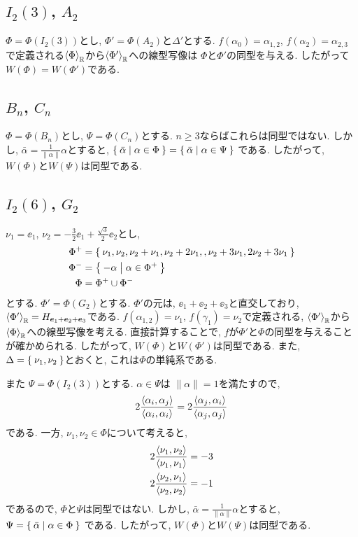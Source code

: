 \subsection{$I_2(3)$, $A_2$}
$\Phi=\Phi(I_2(3))$とし,
$\Phi'=\Phi(A_2)$と$\Delta'$とする.
$f(\alpha_0)=\alpha_{1,2}$,
$f(\alpha_2)=\alpha_{2,3}$
で定義される$\Braket{\Phi}_{\mathbb{R}}$から$\Braket{\Phi'}_{\mathbb{R}}$への線型写像は
$\Phi$と$\Phi'$の同型を与える.
したがって
$W(\Phi)=W(\Phi')$である.


\subsection{$B_n$, $C_n$}
$\Phi=\Phi(B_n)$とし,
$\Psi=\Phi(C_n)$とする.
$n\geq 3$ならばこれらは同型ではない.
しかし,
$\bar\alpha=\frac{1}{\|\alpha\|}\alpha$とすると,
$\Set{\bar\alpha| \alpha\in \Phi}=\Set{\bar\alpha| \alpha\in \Psi}$
である.
したがって, $W(\Phi)$と$W(\Psi)$は同型である.


\subsection{$I_2(6)$, $G_2$}
$\nu_1=\ee_1$, $\nu_2=-\frac{3}{2}\ee_1+\frac{\sqrt{3}}{2}\ee_2$とし,
\begin{align*}
  \Phi^+
  &=
  \Set{\nu_1,\nu_2,\nu_2+\nu_1,\nu_2+2\nu_1,,\nu_2+3\nu_1,2\nu_2+3\nu_1}\\
  \Phi^-&=\Set{-\alpha|\alpha\in\Phi^+}\\
  \Phi&=\Phi^+\cup\Phi^-
\end{align*}
とする.
$\Phi'=\Phi(G_2)$とする.
$\Phi'$の元は, $\ee_1+\ee_2+\ee_3$と直交しており,
$\Braket{\Phi'}_{\mathbb{R}}=H_{\boldsymbol{e}_1+\boldsymbol{e}_2+\boldsymbol{e}_3}$である.
$f(\alpha_{1,2})=\nu_1$,
$f(\gamma_{1})=\nu_2$で定義される,
$\Braket{\Phi'}_{\mathbb{R}}$から
$\Braket{\Phi}_{\mathbb{R}}$への線型写像を考える.
直接計算することで,
$f$が$\Phi'$と$\Phi$の同型を与えることが確かめられる.
したがって, $W(\Phi)$と$W(\Phi')$は同型である.
また, $\Delta=\Set{\nu_1,\nu_2}$とおくと,
これは$\Phi$の単純系である.

また
$\Psi=\Phi(I_2(3))$とする.
$\alpha\in \Psi$は
$\|\alpha\|=1$を満たすので,
\begin{align*}
  2\frac{\Braket{\alpha_i,\alpha_j}}{\Braket{\alpha_i,\alpha_i}}
= 2\frac{\Braket{\alpha_j,\alpha_i}}{\Braket{\alpha_j,\alpha_j}}
\end{align*}
である.
一方,
$\nu_{1},\nu_{2} \in \Phi$について考えると,
\begin{align*}
  2\frac{\Braket{\nu_{1},\nu_2}}{\Braket{\nu_{1},\nu_{1}}}
  &=-3\\
  2\frac{\Braket{\nu_{2},\nu_1}}{\Braket{\nu_{2},\nu_{2}}}
  &=-1
\end{align*}
であるので,
$\Phi$と$\Psi$は同型ではない.
しかし,
$\bar\alpha=\frac{1}{\|\alpha\|}\alpha$とすると,
$\Psi=\Set{\bar\alpha| \alpha\in \Phi}$
である.
したがって, $W(\Phi)$と$W(\Psi)$は同型である.


